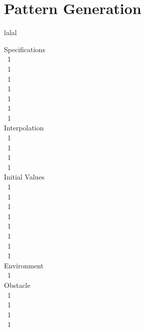\section{Pattern Generation}
\label{sec::32_pg}
lalal
\begin{minipage}{1.\textwidth}
	\begin{minipage}{0.3\textwidth}
		\scriptsize{
			\hfill Specifications\\
			\mbox{}~\hfill 1\\
			\mbox{}~\hfill 1\\
			\mbox{}~\hfill 1\\
			\mbox{}~\hfill 1\\
			\mbox{}~\hfill 1\\
			\mbox{}~\hfill 1\\
			\mbox{}~\hfill 1\\
			
			\hfill Interpolation\\
			\mbox{}~\hfill 1\\
			\mbox{}~\hfill 1\\
			\mbox{}~\hfill 1\\
			\mbox{}~\hfill 1\\
			
			\hfill Initial Values\\
			\mbox{}~\hfill 1\\
			\mbox{}~\hfill 1\\
			\mbox{}~\hfill 1\\
			\mbox{}~\hfill 1\\
			\mbox{}~\hfill 1\\
			\mbox{}~\hfill 1\\
			\mbox{}~\hfill 1\\
			\mbox{}~\hfill 1\\
			
			\hfill Environment\\
			\mbox{}~\hfill 1\\
			
			\hfill Obstacle\\
			\mbox{}~\hfill 1\\
			\mbox{}~\hfill 1\\
			\mbox{}~\hfill 1\\
			\mbox{}~\hfill 1\\
			
}
\end{minipage}
\end{minipage}
